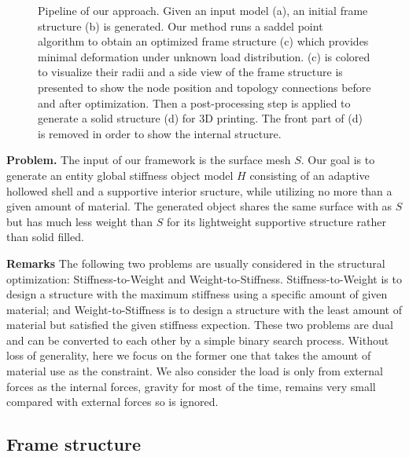 \begin{figure}[t]
\caption{Pipeline of our approach. Given an input model (a), an initial frame structure (b) is generated. Our method runs a saddel point algorithm to obtain an optimized frame structure (c) which provides minimal deformation under unknown load distribution. (c) is colored to visualize their radii and a side view of the frame structure is presented to show the node position and topology connections before and after optimization. Then a post-processing step is applied to generate a solid structure (d) for 3D printing.
%
The front part of (d) is removed in order to show the internal structure.%
}
\label{fig:pipeline}
\end{figure}



\noindent\textbf{Problem.}
The input of our framework is the surface mesh $S$.
Our goal is to generate an entity global stiffness object model $H$ consisting of an adaptive hollowed shell and a supportive interior sructure, while utilizing no more than a given amount of material. The generated object shares the same surface with as $S$ but has much less weight than $S$ for its lightweight supportive structure rather than solid filled.

\noindent\textbf{Remarks} The following two problems are usually considered in the structural optimization: Stiffness-to-Weight and Weight-to-Stiffness.
Stiffness-to-Weight is to design a structure with the maximum stiffness using a specific amount of given material; and Weight-to-Stiffness is to design a structure with the least amount of material but satisfied the given stiffness expection. These two problems are dual and can be converted to each other by a simple binary search process. Without loss of generality, here we focus on the former one that takes the amount of material use as the constraint. We also consider the load is only from external forces as the internal forces, gravity for most of the time, remains very small compared with external forces so is ignored.



\subsection{Frame structure}
\label{subsec:frame}


